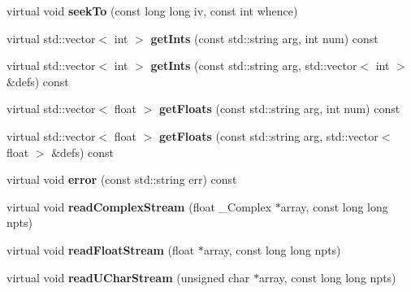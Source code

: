\begin{DoxyCompactItemize}
\mbox{\label{classrsf_reg_file_a2e653e3a5ee6f5b09f532341fd103ad1}} 
virtual void {\bfseries seek\+To} (const long long iv, const int whence)
\item 
\mbox{\label{classrsf_reg_file_a62d07a8489c7e6ead6cdba452337778c}} 
virtual std\+::vector$<$ int $>$ {\bfseries get\+Ints} (const std\+::string arg, int num) const
\item 
\mbox{\label{classrsf_reg_file_a5c87067e077a3f93facee47c5c5e8fb2}} 
virtual std\+::vector$<$ int $>$ {\bfseries get\+Ints} (const std\+::string arg, std\+::vector$<$ int $>$ \&defs) const
\item 
\mbox{\label{classrsf_reg_file_a3cc2172282518a63f2e694092d61c8ff}} 
virtual std\+::vector$<$ float $>$ {\bfseries get\+Floats} (const std\+::string arg, int num) const
\item 
\mbox{\label{classrsf_reg_file_a9824e2fb99c7b551138a22082bed614d}} 
virtual std\+::vector$<$ float $>$ {\bfseries get\+Floats} (const std\+::string arg, std\+::vector$<$ float $>$ \&defs) const
\item 
\mbox{\label{classrsf_reg_file_ab224312c21676f7e29ba7e0d4e764287}} 
virtual void {\bfseries error} (const std\+::string err) const
\item 
\mbox{\label{classrsf_reg_file_afb8f525a65dbcd63f1c651cff57ae617}} 
virtual void {\bfseries read\+Complex\+Stream} (float \+\_\+\+Complex $\ast$array, const long long npts)
\item 
\mbox{\label{classrsf_reg_file_a6926221ddc3b54bce486be345b6505bf}} 
virtual void {\bfseries read\+Float\+Stream} (float $\ast$array, const long long npts)
\item 
\mbox{\label{classrsf_reg_file_aec341f3bb5104a499f6252a5ee4be0f5}} 
virtual void {\bfseries read\+U\+Char\+Stream} (unsigned char $\ast$array, const long long npts)
\item 
\mbox{\label{classrsf_reg_file_a4b311a7ba2c071aa8c4d3f4a79c0b543}} 

\end{DoxyCompactItemize}
